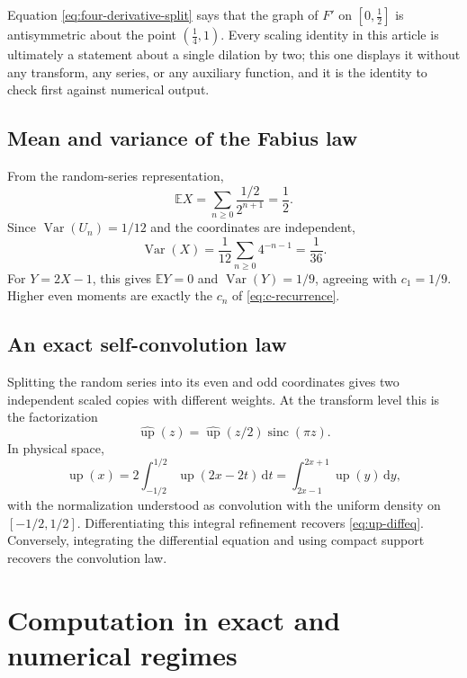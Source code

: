 \documentclass[11pt,oneside]{article}
\theoremstyle{definition}
\theoremstyle{remark}
\newcommand{\Up}{\operatorname{up}}
\newcommand{\sinc}{\operatorname{sinc}}
\newcommand{\dd}{\,\mathrm d}
\newcommand{\Var}{\operatorname{Var}}
\newcommand{\E}{\mathbb E}
\begin{document}
Equation \eqref{eq:four-derivative-split} says that the graph of $F'$ on $[0,\tfrac12]$ is
antisymmetric about the point $(\tfrac14,1)$.  Every scaling identity in this article is
ultimately a statement about a single dilation by two; this one displays it without any
transform, any series, or any auxiliary function, and it is the identity to check first
against numerical output.

\subsection{Mean and variance of the Fabius law}

From the random-series representation,
\begin{equation}
 \E X=\sum_{n\ge0}\frac{1/2}{2^{n+1}}=\frac12.             \label{eq:X-mean}
\end{equation}
Since $\Var(U_n)=1/12$ and the coordinates are independent,
\begin{equation}
 \Var(X)=\frac1{12}\sum_{n\ge0}4^{-n-1}=\frac1{36}.        \label{eq:X-variance}
\end{equation}
For $Y=2X-1$, this gives $\E Y=0$ and $\Var(Y)=1/9$, agreeing with $c_1=1/9$.
Higher even moments are exactly the $c_n$ of \eqref{eq:c-recurrence}.

\subsection{An exact self-convolution law}

Splitting the random series into its even and odd coordinates gives two independent scaled
copies with different weights.  At the transform level this is the factorization
\begin{equation}
 \widehat{\Up}(z)
 =\widehat{\Up}(z/2)\sinc(\pi z).                          \label{eq:transform-self-convolution}
\end{equation}
In physical space,
\begin{equation}
 \Up(x)=2\int_{-1/2}^{1/2}\Up(2x-2t)\dd t
       =\int_{2x-1}^{2x+1}\Up(y)\dd y,                  \label{eq:up-convolution-refinement}
\end{equation}
with the normalization understood as convolution with the uniform density on
$[-1/2,1/2]$.  Differentiating this integral refinement recovers
\eqref{eq:up-diffeq}.  Conversely, integrating the differential equation and using compact
support recovers the convolution law.

\section{Computation in exact and numerical regimes}
\label{sec:computation}
\end{document}
